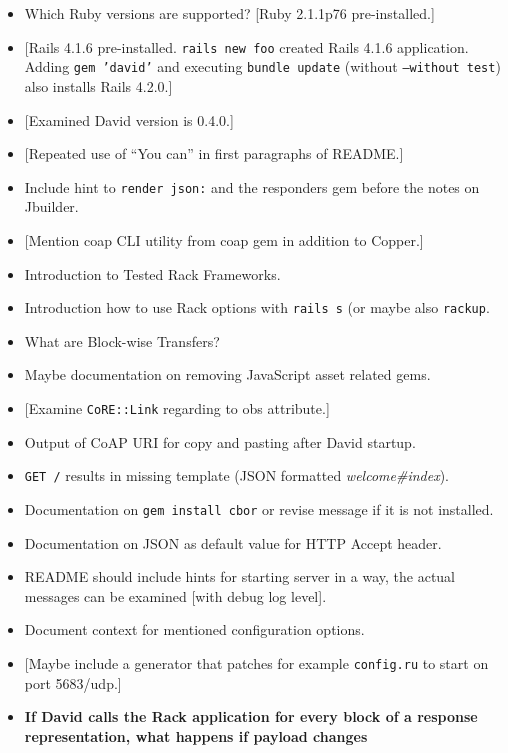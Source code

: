 		\begin{itemize}
			\item Which Ruby versions are supported? {[}Ruby 2.1.1p76
				pre-installed.{]}
			\item {[}\ac{Rails} 4.1.6 pre-installed. \texttt{rails new foo}
				created \ac{Rails} 4.1.6 application. Adding \texttt{gem
				'david'} and executing \texttt{bundle update} (without
				\texttt{--without test}) also installs \ac{Rails} 4.2.0.{]}
			\item {[}Examined David version is 0.4.0.{]}
			\item {[}Repeated use of \enquote{You can} in first paragraphs of
				README.{]}
			\item Include hint to \texttt{render json:} and the responders gem
				before the notes on Jbuilder.
			\item {[}Mention coap \ac{CLI} utility from coap gem in addition to
				Copper.{]}
			\item Introduction to Tested Rack Frameworks.
			\item Introduction how to use Rack options with \texttt{rails s}
				(or maybe also \texttt{rackup}.
			\item What are Block-wise Transfers?
			\item Maybe documentation on removing JavaScript asset related
				gems.
			\item {[}Examine \texttt{CoRE::Link} regarding to obs attribute.{]}
			\item Output of \ac{CoAP} \ac{URI} for copy and pasting after David
				startup.
			\item \texttt{GET /} results in missing template (\ac{JSON}
				formatted \emph{welcome\#index}).
			\item Documentation on \texttt{gem install cbor} or revise message
				if it is not installed.
			\item Documentation on \ac{JSON} as default value for \ac{HTTP}
				Accept header.
			\item README should include hints for starting server in a way, the
				actual messages can be examined {[}with debug log level{]}.
			\item Document context for mentioned configuration options.
			\item {[}Maybe include a generator that patches for example
				\texttt{config.ru} to start on port 5683/udp.{]}
			\item \textbf{If David calls the Rack application for every block
				of a response representation, what happens if payload changes
}
\end{itemize}
